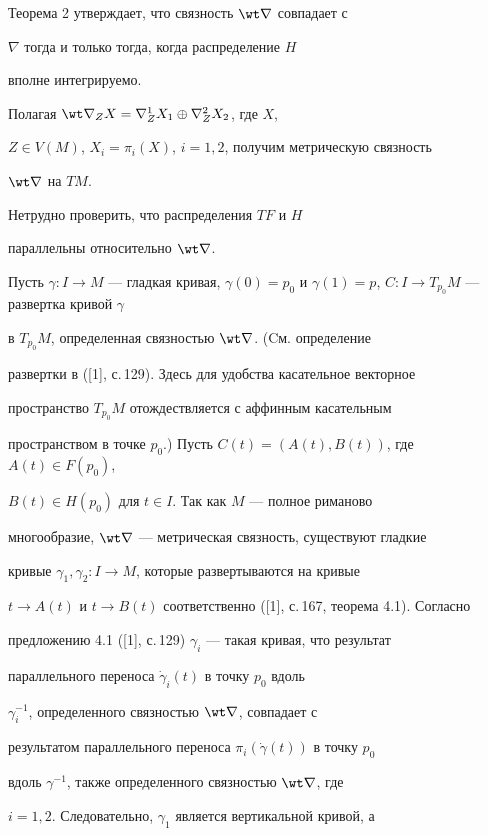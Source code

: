  


Теорема 2 утверждает, что связность $\wt \nabla$ совпадает с 


$\nabla$ тогда и только тогда, когда распределение $H$ 


вполне интегрируемо. 





Полагая $\wt \nabla_ZX=\nabla^1_ZX_1\oplus \nabla^2_ZX_2$, где $X$, 


$Z\in V(M)$, $X_i=\pi_i(X)$, $i=1, 2$, получим метрическую связность 


$\wt \nabla$ на $TM$. 


Нетрудно проверить, что распределения $TF$ и $H$ 


параллельны относительно $\wt \nabla$. 


Пусть $\gamma:I\to M$ --- гладкая кривая, $\gamma 


(0)=p_0$ и $\gamma (1)=p$, $C:I\to T_{p_0}M$ --- развертка кривой $\gamma$


в $T_{p_0}M$, определенная связностью $\wt \nabla$. (Cм. определение 


развертки в ([1], с.\,129). Здесь для удобства касательное векторное 


пространство $T_{p_0}M$ отождествляется с аффинным касательным 


пространством в точке $p_0$.) Пусть $C(t)=(A(t),B(t))$, где $A(t)\in F(p_0)$, 


$B(t)\in H(p_0)$ для $t\in I$. Так как $M$ --- полное риманово 


многообразие, $\wt \nabla$ --- метрическая связность, существуют гладкие 


кривые $\gamma_1, \gamma_2:I\to M$, которые развертываются на кривые 


$t\to A(t)$ и $t\to B(t)$ соответственно ([1], с.\,167, теорема 4.1). Согласно 


предложению 4.1 ([1], с.\,129) $\gamma_i$ --- такая кривая, что результат 


параллельного переноса $\Dot \gamma_i(t)$ в точку $p_0$ вдоль 


$\gamma_i^{-1}$, определенного связностью $\wt \nabla$, совпадает с 


результатом параллельного переноса $\pi_i(\Dot \gamma(t))$ в точку $p_0$ 


вдоль $\gamma^{-1}$, также определенного связностью $\wt \nabla$, где 


$i=1,2$. Следовательно, $\gamma_1$ является вертикальной кривой, а 



